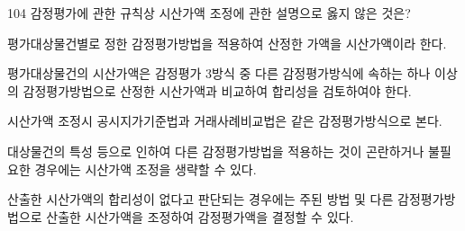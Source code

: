 \begin{question}{104}
감정평가에 관한 규칙상 시산가액 조정에 관한 설명으로 옳지 않은 것은?
\begin{choices}
  \item 평가대상물건별로 정한 감정평가방법을 적용하여 산정한 가액을 시산가액이라 한다.
  \item 평가대상물건의 시산가액은 감정평가 3방식 중 다른 감정평가방식에 속하는 하나 이상의 감정평가방법으로 산정한 시산가액과 비교하여 합리성을 검토하여야 한다.
  \item 시산가액 조정시 공시지가기준법과 거래사례비교법은 같은 감정평가방식으로 본다.
  \item 대상물건의 특성 등으로 인하여 다른 감정평가방법을 적용하는 것이 곤란하거나 불필요한 경우에는 시산가액 조정을 생략할 수 있다.
  \item 산출한 시산가액의 합리성이 없다고 판단되는 경우에는 주된 방법 및 다른 감정평가방법으로 산출한 시산가액을 조정하여 감정평가액을 결정할 수 있다.
\end{choices}
\end{question}
